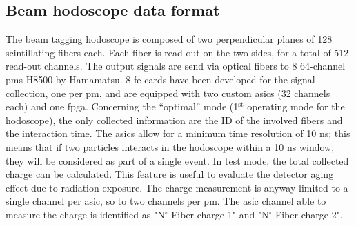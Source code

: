 \subsection{Beam hodoscope data format}\label{chapappA::subsec::hodoDataFormat}
The beam tagging hodoscope is composed of two perpendicular planes of 128 scintillating fibers each. Each fiber is read-out on the two sides, for a total of  512 read-out channels. The output signals are send via optical fibers to 8 64-channel \glspl{pm} H8500 by Hamamatsu. 8 \gls{fe} cards have been developed for the signal collection, one per \gls{pm}, and are equipped with two custom \glspl{asic} (32 channels each) and one \gls{fpga}.\newline
Concerning the \enquote{optimal} mode (1$^{\mathrm{st}}$ operating mode for the hodoscope), the only collected information are the ID of the involved fibers and the interaction time. The \glspl{asic} allow for a minimum time resolution of 10 ns; this means that if two particles interacts in the hodoscope within a 10 ns window, they will be considered as part of a single event.\newline
In test mode, the total collected charge can be calculated. This feature is useful to evaluate the detector aging effect due to radiation exposure. The charge measurement is anyway limited to a single channel per \gls{asic}, so to two channels per \gls{pm}. The \gls{asic} channel able to measure the charge is identified as "N$^{\circ}$ Fiber charge 1" and "N$^{\circ}$ Fiber charge 2".

